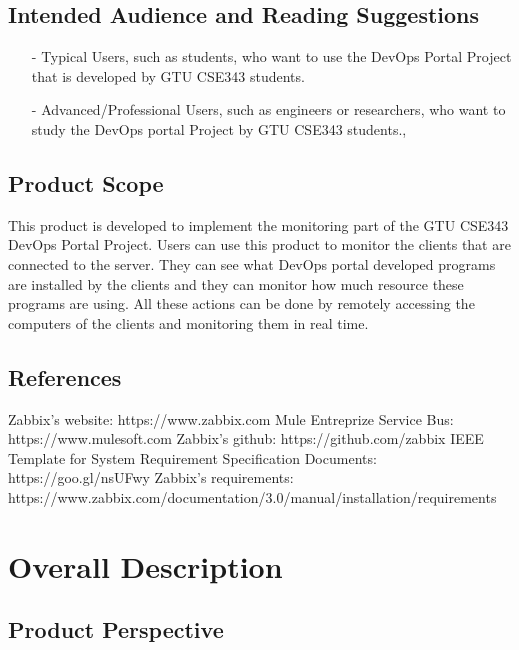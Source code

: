 \documentclass{article}
\begin{document}
     \subsection{Intended Audience and Reading Suggestions}
\flushleft 
\begin{itemize}
	\item[-] 
	Typical Users, such as students, who want to use the DevOps Portal Project that is developed by GTU CSE343 students.
	\item[-] Advanced/Professional Users, such as engineers or researchers, who want to study the DevOps portal Project by  GTU CSE343 students.,
\end{itemize}

     \subsection{Product Scope}

     This product is developed to implement the monitoring part of the GTU CSE343 DevOps Portal Project. Users can use this product to monitor the clients that are connected to the server. They can see what DevOps portal developed programs are installed by the clients and they can monitor how much resource these programs are using. All these actions can be done by remotely accessing the computers of the clients and monitoring them in real time.




\subsection{References}
     
Zabbix’s website:  
https://www.zabbix.com
\newline
Mule Entreprize Service Bus:
https://www.mulesoft.com
\newline
Zabbix’s github:
https://github.com/zabbix
\newline
IEEE Template for System Requirement Specification Documents:
https://goo.gl/nsUFwy
\newline
Zabbix’s requirements:
https://www.zabbix.com/documentation/3.0/manual/installation/requirements

\section{Overall Description}

    \subsection{Product Perspective}
\end{document}

